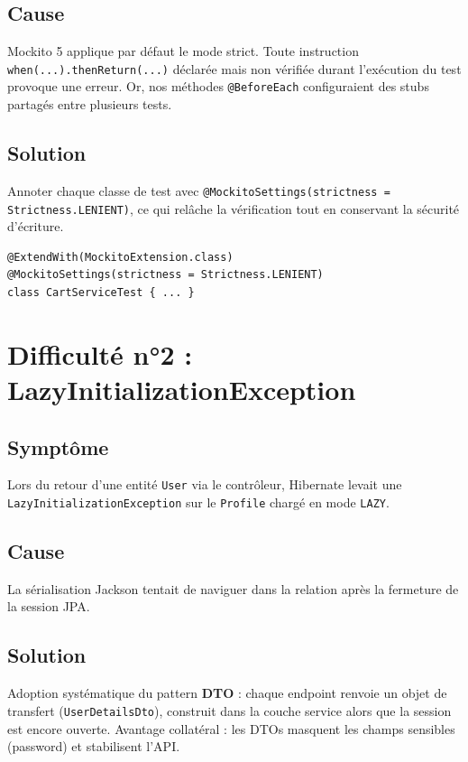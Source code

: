 \documentclass[11pt,a4paper,oneside]{report}
\begin{document}
\subsection{Cause}
Mockito 5 applique par défaut le mode strict. Toute instruction
\texttt{when(...).thenReturn(...)} déclarée mais non vérifiée durant
l'exécution du test provoque une erreur. Or, nos méthodes
\texttt{@BeforeEach} configuraient des stubs partagés entre plusieurs tests.

\subsection{Solution}
Annoter chaque classe de test avec
\texttt{@MockitoSettings(strictness = Strictness.LENIENT)}, ce qui
relâche la vérification tout en conservant la sécurité d'écriture.

\begin{lstlisting}[style=javastyle]
@ExtendWith(MockitoExtension.class)
@MockitoSettings(strictness = Strictness.LENIENT)
class CartServiceTest { ... }
\end{lstlisting}

\section{Difficulté n°2 : LazyInitializationException}

\subsection{Symptôme}
Lors du retour d'une entité \texttt{User} via le contrôleur, Hibernate
levait une \texttt{LazyInitializationException} sur le \texttt{Profile}
chargé en mode \texttt{LAZY}.

\subsection{Cause}
La sérialisation Jackson tentait de naviguer dans la relation après la
fermeture de la session JPA.

\subsection{Solution}
Adoption systématique du pattern \textbf{DTO} : chaque endpoint renvoie
un objet de transfert (\texttt{UserDetailsDto}), construit dans la couche
service alors que la session est encore ouverte. Avantage collatéral :
les DTOs masquent les champs sensibles (password) et stabilisent l'API.
\end{document}
